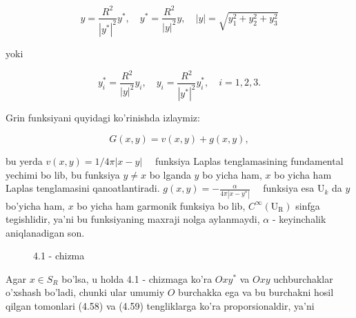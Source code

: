 \documentclass[10pt]{article}
\begin{document}
$$
y=\frac{R^{2}}{\left|y^{*}\right|^{2}} y^{*}, \quad y^{*}=\frac{R^{2}}{|y|^{2}} y, \quad|y|=\sqrt{y_{1}^{2}+y_{2}^{2}+y_{3}^{2}}
$$

yoki


\begin{equation*}
y_{i}^{*}=\frac{R^{2}}{|y|^{2}} y_{i}, \quad y_{i}=\frac{R^{2}}{\left|y^{*}\right|^{2}} y_{i}^{*}, \quad i=1,2,3 . \tag{4.59}
\end{equation*}


Grin funksiyani quyidagi ko'rinishda izlaymiz:


\begin{equation*}
G(x, y)=v(x, y)+g(x, y), \tag{4.60}
\end{equation*}


bu yerda $v(x, y)=1 / 4 \pi|x-y| \quad$ funksiya Laplas tenglamasining fundamental yechimi bo lib, bu funksiya $y \neq x$ bo lganda $y$ bo yicha ham, $x$ bo yicha ham Laplas tenglamasini qanoatlantiradi. $g(x, y)=-\frac{\alpha}{4 \pi\left|x-y^{*}\right|} \quad$ funksiya esa $\mathrm{U}_{k}$ da $y$ bo'yicha ham, $x$ bo yicha ham garmonik funksiya bo lib, $C^{\infty}\left(\mathrm{U}_{\mathrm{R}}\right)$ sinfga tegishlidir, ya'ni bu funksiyaning maxraji nolga aylanmaydi, $\alpha$ - keyinchalik aniqlanadigan son.

\begin{figure}[h]
\begin{center}
\captionsetup{labelformat=empty}
\caption{4.1 - chizma}
\end{center}
\end{figure}

Agar $x \in S_{R}$ bo'lsa, u holda 4.1 - chizmaga ko'ra $O x y{ }^{*}$ va $O x y$ uchburchaklar o'xshash bo'ladi, chunki ular umumiy $O$ burchakka ega va bu burchakni hosil qilgan tomonlari (4.58) va (4.59) tengliklarga ko'ra proporsionaldir, ya'ni
\end{document}
